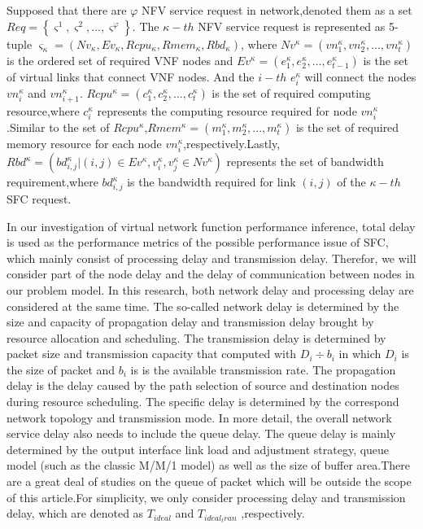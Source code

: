 \documentclass{ieeeaccess}
\begin{document}
Supposed that there are $\varphi$  NFV service request in network,denoted them as a set $Req=\left \{ {\varsigma}^{1},{\varsigma}^{2},...,{\varsigma}^{\varphi}  \right \} $. The $\kappa-th$ NFV service request is represented as 5-tuple  ${\varsigma }_{\kappa }=\left ( Nv_{\kappa},Ev_{\kappa},Rcpu_{\kappa},Rmem_{\kappa},Rbd_{\kappa} \right )$, where $Nv^{\kappa}=\left (vn_{1}^{\kappa},vn_{2}^{\kappa},...,vn_{t}^{\kappa} \right )$ is the ordered set of required VNF nodes and $Ev^{\kappa}=\left ( e_{1}^{\kappa},e_{2}^{\kappa},...,e_{t-1}^{\kappa} \right )$ is the set of virtual links that connect VNF nodes. And the $i-th$ $e_{i}^{\kappa}$ will connect the nodes $vn_{i}^{\kappa}$ and $vn_{i+1}^{\kappa}$. $Rcpu^{\kappa}=\left ( c_{1}^{\kappa},c_{2}^{\kappa},...,c_{t}^{\kappa} \right )$ is the set of required computing resource,where $c_{i}^{\kappa}$   represents the computing resource required for node $vn_{i}^{\kappa}$.Similar to the set of $Rcpu^{\kappa}$,$Rmem^{\kappa}=\left ( m_{1}^{\kappa},m_{2}^{\kappa},...,m_{t}^{\kappa} \right )$ is the set of required memory resource for each node $vn_{i}^{\kappa}$,respectively.Lastly, $Rbd^{\kappa}=\left ( bd_{i,j}^{\kappa}|\left ( i,j \right )\in Ev^{\kappa},v_{i}^{\kappa},v_{j}^{\kappa} \in Nv^{\kappa} \right )$ represents the set of bandwidth requirement,where $bd_{i,j}^{\kappa} $ is the bandwidth required for link $\left( i,j \right)$ of the ${\kappa-th}$ SFC request.

In our investigation of virtual network function performance inference, total delay is used as the performance metrics of the possible performance issue of SFC, which mainly consist of processing delay and transmission delay. Therefor, we will consider part of the node delay and the delay of communication between nodes in our problem model. In this research, both network delay and processing delay are considered at the same time. The so-called network delay is determined by the size and capacity of propagation delay and transmission delay brought by resource allocation and scheduling. The transmission delay is determined by packet size and transmission capacity that computed with $D_{i} \div b_{i}$   in which $D_{i}$ is the size of packet and $b_{i}$ is is the available transmission rate. The propagation delay is the delay caused by the path selection of source and destination nodes during resource scheduling. The specific delay is determined by the correspond network topology and transmission mode. In more detail, the overall network service delay also needs to include the queue delay. The queue delay is mainly determined by the output interface link load and adjustment strategy, queue model (such as the classic M/M/1 model\cite{b23}) as well as the size of buffer area.There are a great deal of studies on the queue of packet which will be outside the scope of this article.For simplicity, we only consider processing delay and transmission delay, which are denoted as $T_{ideal}$ and $T_{ideal_tran}$ ,respectively.
\end{document}
